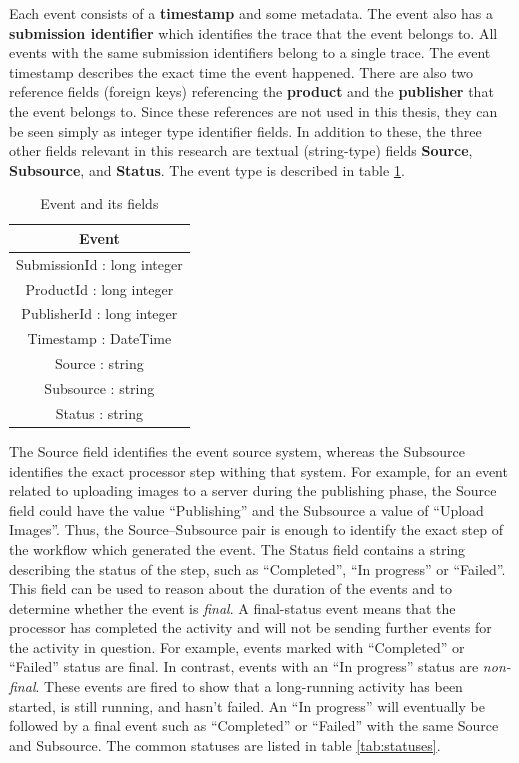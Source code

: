 Each event consists of a \textbf{timestamp} and some metadata. 
The event also has a \textbf{submission identifier} which identifies the trace that the event belongs to.
All events with the same submission identifiers belong to a single trace.
The event timestamp describes the exact time the event happened. 
There are also two reference fields (foreign keys) referencing the \textbf{product} and the \textbf{publisher} that the event belongs to. 
Since these references are not used in this thesis, they can be seen simply as integer type identifier fields.
In addition to these, the three other fields relevant in this research are textual (string-type) fields \textbf{Source}, \textbf{Subsource}, and \textbf{Status}.
The event type is described in table \ref{tab:event}.

\begin{table}[htb]
\begin{center}
\begin{tabular}{| c |}
\hline
\textbf{Event} \\
\hline
SubmissionId : long integer\\
ProductId : long integer\\
PublisherId : long integer\\
Timestamp : DateTime\\
Source : string\\
Subsource : string\\
Status : string\\
\hline
\end{tabular}
\end{center}
\caption{Event and its fields}
\label{tab:event}
\end{table}

The Source field identifies the event source system, whereas the Subsource identifies the exact processor step withing that system. 
For example, for an event related to uploading images to a server during the publishing phase, the Source field could have the value ``Publishing'' and the Subsource a value of ``Upload Images''.
Thus, the Source--Subsource pair is enough to identify the exact step of the workflow which generated the event. 
The Status field contains a string describing the status of the step, such as ``Completed'', ``In progress'' or ``Failed''. 
This field can be used to reason about the duration of the events and to determine whether the event is \emph{final}. 
A final-status event means that the processor has completed the activity and will not be sending further events for the activity in question.
For example, events marked with ``Completed'' or ``Failed'' status are final.
In contrast, events with an ``In progress'' status are \emph{non-final}.
These events are fired to show that a long-running activity has been started, is still running, and hasn't failed.
An ``In progress'' will eventually be followed by a final event such as ``Completed'' or ``Failed'' with the same Source and Subsource.
The common statuses are listed in table \ref{tab:statuses}.

